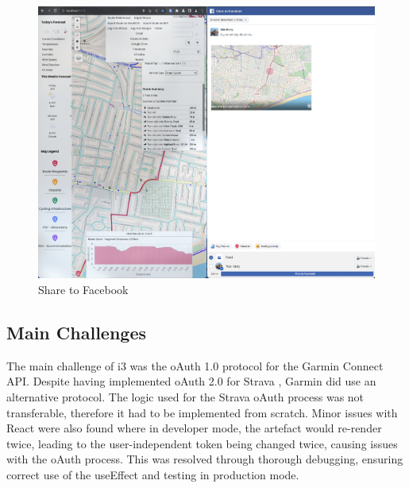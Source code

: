 \begin{figure}[!ht]
  \centering
  \includegraphics[width=425px]{figures/Progress Images/Iteration-3/SR51/SR51-Share to Facebook.png}
  \caption{Share to Facebook}
  \label{fig:facebook-share}
\end{figure}

\subsection{Main Challenges}
\label{iteration3:main-challenges}

The main challenge of i3 was the oAuth 1.0 protocol for the Garmin Connect API. Despite having implemented oAuth 2.0 for Strava , Garmin did use an alternative protocol. The logic used for the Strava oAuth process was not transferable, therefore it had to be implemented from scratch. Minor issues with React were also found where in developer mode, the artefact would re-render twice, leading to the user-independent token being changed twice, causing issues with the oAuth process. This was resolved through thorough debugging, ensuring correct use of the useEffect and testing in production mode.